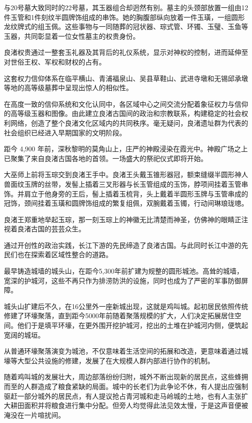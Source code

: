 与20号墓大致同时的22号墓，其玉器组合却迥然有别。墓主的头颈部放置一组由12件玉管和1件刻纹半圆牌饰组成的串饰。她的胸腹部纵向放着一件玉璜，一组圆形龙纹牌式的组玉佩。这些事物与一同随葬的冠状器、琮式管、环镯、玉璧、玉鱼等玉器，共同彰显着一位女性墓主的权贵身份。

良渚权贵通过一整套玉礼器及其背后的礼仪系统，显示对神权的控制，进而延伸至对世俗王权、军权和财权的占有。

这套权力信仰体系在临平横山、青浦福泉山、吴县草鞋山、武进寺墩和无锡邱承墩等地的高等级墓葬中呈现出惊人的相似性。

在高度一致的信仰系统和文化认同中，各区域中心之间交流分配着象征权力与信仰的高等级玉器和图像。由此建立良渚古国间的政治和宗教联系，构建稳定的社会权利网络，创造了整个良渚文化区域内的共同秩序。毫无疑问，良渚遗址群为代表的社会组织已经进入早期国家的文明阶段。

距今 4,900 年前，深秋黎明的莫角山上，庄严的神殿浸染在霞光中。神殿广场之上已聚集了来自良渚古国各地的首领。一场盛大的祭祀仪式即将开始。

大巫师上前将玉琮交到良渚王手中。良渚王头戴玉锥形器冠，额束缝缀半圆形神人兽面纹玉牌的丝带，发髻上插着三叉形器与长玉管组成的玉饰，脖项间挂着玉管串饰。并肩立于他身旁的王后，髻上插着玉梳背，头上戴着半圆形玉牌与玉管串成的冠饰，颈间挂着玉璜和圆牌饰组成的繁复组佩，双腕戴着玉镯，行动间琳琅珑璁。

良渚王郑重地举起玉琮，那一刻玉琮上的神徽无比清楚而神圣，仿佛神的眼睛正注视着良渚古国的芸芸众生。

通过开创性的政治实践，长江下游的先民缔造了良渚古国。与此同时长江中游的先民们也在探索着区域性整合的道路。

最早铸造城墙的城头山，在距今5,300年前扩建为规整的圆形城池。高耸的城墙，宽深的护城河，这些不再只作为排涝防洪的设施，同时也成为了严密的军事防御屏障。

城头山扩建后不久，在16公里外一座新城出现，这就是鸡叫城。起初居民依照传统修建了环壕聚落，直到距今5000年前随着聚落规模的扩大，人们决定拓展居住空间。他们于是填平环壕，在更外围开挖护城河，挖出的土堆在护城河内侧，便筑起宽阔的城垣。

从普通环壕聚落演变为城池，不仅意味着生活空间的拓展和改造，更意味着通过城壕等大型公共设施的修建，发展了在大规模人群内部进行协作的机制。

随着鸡叫城的发展壮大，周边部落纷纷归附，城外不断出现新的居民点，这些蜂拥而至的人群造成了粮食紧缺的局面。城中的长老们为此争论不休，有人提出应强制驱赶一部分城外的居民点，有人提议抢占青河城和走马岭城的土地，也有人主张扩大耕田面积并将粮食进行集中分配。但旁人均觉得此法见效太慢，于是这声音便被淹没在一片喧扰间。

